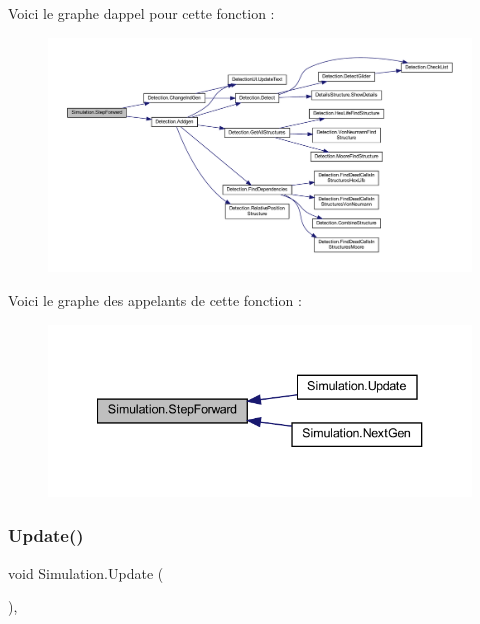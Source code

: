 Voici le graphe d\textquotesingle{}appel pour cette fonction \+:
\nopagebreak
\begin{figure}[H]
\begin{center}
\leavevmode
\includegraphics[width=350pt]{class_simulation_a1ba6581d305c2d60d174e0cffd917719_cgraph}
\end{center}
\end{figure}
Voici le graphe des appelants de cette fonction \+:
\nopagebreak
\begin{figure}[H]
\begin{center}
\leavevmode
\includegraphics[width=340pt]{class_simulation_a1ba6581d305c2d60d174e0cffd917719_icgraph}
\end{center}
\end{figure}
\mbox{\label{class_simulation_a8486cde41c003277c1ac75fffeda973b}} 
\subsubsection{\texorpdfstring{Update()}{Update()}}
{\footnotesize\ttfamily void Simulation.\+Update (\begin{DoxyParamCaption}{ }\end{DoxyParamCaption})\hspace{0.3cm}{\ttfamily [inline]}, {\ttfamily [private]}}

